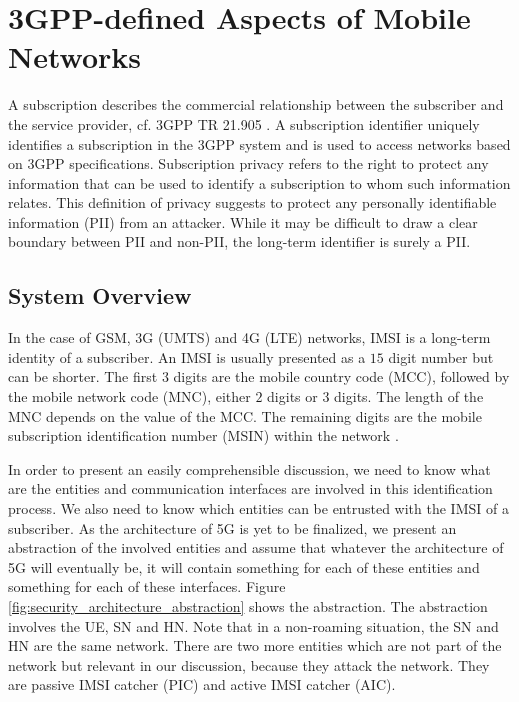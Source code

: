 \documentclass{river-journal}
\begin{document}
\section{3GPP-defined Aspects of Mobile Networks}
\label{sec:3GPP-defined_aspects_of_mobile_network}
A subscription describes the commercial relationship between the subscriber and the service provider, cf. 3GPP TR 21.905 \cite{TR21905}. A subscription identifier uniquely identifies a subscription in the 3GPP system and is used to access networks based on 3GPP specifications. Subscription privacy refers to the right to protect any information that can be used to identify a subscription to whom such information relates. This definition of privacy suggests to protect any personally identifiable information (PII) from an attacker. While it may be difficult to draw a clear boundary between PII and non-PII, the long-term identifier is surely a PII. 

\subsection{System Overview}
In the case of GSM, 3G (UMTS) and 4G (LTE) networks, IMSI is a long-term identity of a subscriber. An IMSI is usually presented as a $15$ digit number but can be shorter. The first $3$ digits are the mobile country code (MCC), followed by the mobile network code (MNC), either $2$ digits or $3$ digits. The length of the MNC depends on the value of the MCC. The remaining digits are the mobile subscription identification number (MSIN) within the network \cite{TS23003}. 

In order to present an easily comprehensible discussion, we need to know what are the entities and communication interfaces are involved in this identification process. We also need to know which entities can be entrusted with the IMSI of a subscriber. As the architecture of 5G is yet to be finalized, we present an abstraction of the involved entities and assume that whatever the architecture of 5G will eventually be, it will contain something for each of these entities and something for each of these interfaces. Figure \ref{fig:security_architecture_abstraction} shows the abstraction. The abstraction involves the UE, SN and HN. Note that in a non-roaming situation, the SN and HN are the same network. There are two more entities which are not part of the network but relevant in our discussion, because they attack the network. They are passive IMSI catcher (PIC) and active IMSI catcher (AIC). 
\end{document}

